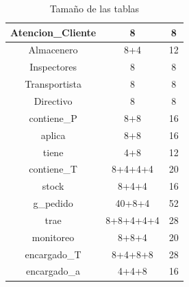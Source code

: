 \documentclass[10pt, a4paper,openany]{report}
\begin{document}
\begin{table}[h]
\begin{center}
\begin{tabular}[c]{|c|c|c|}
			\hline
			Atencion\_Cliente                                          & 8              & 8   \\
			\hline
			Almacenero                                                 & 8+4            & 12  \\
			\hline
			Inspectores                                                & 8              & 8   \\
			\hline
			Transportista                                              & 8              & 8   \\
			\hline
			Directivo                                                  & 8              & 8   \\
			\hline
			contiene\_P                                                & 8+8            & 16  \\
			\hline
			aplica                                                     & 8+8            & 16  \\
			\hline
			tiene                                                      & 4+8            & 12  \\
			\hline
			contiene\_T                                                & 8+4+4+4        & 20  \\
			\hline
			stock                                                      & 8+4+4          & 16  \\
			\hline
			g\_pedido                                                  & 40+8+4         & 52  \\
			\hline
			trae                                                       & 8+8+4+4+4      & 28  \\
			\hline
			monitoreo                                                  & 8+8+4          & 20  \\
			\hline
			encargado\_T                                               & 8+4+8+8        & 28  \\
			\hline
			encargado\_a                                               & 4+4+8          & 16  \\

			\hline
		\end{tabular}
	\end{center}
	\caption{Tamaño de las tablas}
\end{table}
\end{document}
